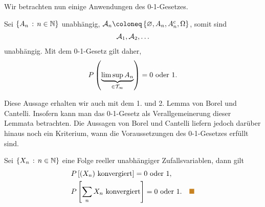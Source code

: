 Wir betrachten nun einige Anwendungen des 0-1-Gesetzes.
\begin{bsp}
Sei $\setdef{A_n}{n\in\N}$ unabhängig, $\AA_n \defl \setd{\varnothing, A_n,
A_n^c,\Omega}$, somit sind
\begin{align*}
\AA_1, \AA_2, \ldots
\end{align*} 
unabhängig. Mit dem 0-1-Gesetz gilt daher,
\begin{align*}
P\left(\underbrace{\limsup A_n}_{\in\TT_\infty}\right) = 0 \text{ oder } 1.
\end{align*}

Diese Aussage erhalten wir auch mit dem 1. und 2. Lemma von Borel und Cantelli.
Insofern kann man das 0-1-Gesetz als Verallgemeinerung dieser Lemmata
betrachten. Die Aussagen von Borel und Cantelli liefern jedoch darüber hinaus
noch ein Kriterium, wann die Voraussetzungen des 0-1-Gesetzes erfüllt
sind.\bsphere
\end{bsp}
\begin{bsp}
Sei $\setdef{X_n}{n\in\N}$ eine Folge reeller unabhängiger Zufallsvariablen,
dann gilt
\begin{align*}
&P\left[ (X_n) \text{ konvergiert} \right] = 0\text{ oder 1},\\
&P\left[ \sum_n X_n \text{ konvergiert} \right] = 0\text{ oder 1}.\bsphere
\end{align*}
\end{bsp}